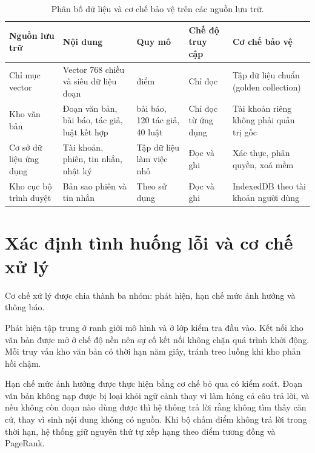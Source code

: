 \begin{table}[htbp]
    \centering
    \caption{Phân bố dữ liệu và cơ chế bảo vệ trên các nguồn lưu trữ.}
    \label{tab:nguon-luu-tru}
    \small
    \begin{tabularx}{\textwidth}{@{}>{\raggedright\arraybackslash}p{2.6cm}>{\raggedright\arraybackslash}p{3.4cm}>{\raggedright\arraybackslash}p{2.4cm}>{\raggedright\arraybackslash}p{2.2cm}>{\raggedright\arraybackslash}X@{}}
        \toprule
        \textbf{Nguồn lưu trữ} & \textbf{Nội dung} & \textbf{Quy mô} & \textbf{Chế độ truy cập} & \textbf{Cơ chế bảo vệ} \\
        \midrule
        Chỉ mục vector & Vector 768 chiều và siêu dữ liệu đoạn & 913.205 điểm & Chỉ đọc & Tập dữ liệu chuẩn (golden collection) \\
        Kho văn bản & Đoạn văn bản, bài báo, tác giả, luật kết hợp & 70.590 bài báo, 120 tác giả, 40 luật & Chỉ đọc từ ứng dụng & Tài khoản riêng không phải quản trị gốc \\
        Cơ sở dữ liệu ứng dụng & Tài khoản, phiên, tin nhắn, nhật ký & Tập dữ liệu làm việc nhỏ & Đọc và ghi & Xác thực, phân quyền, xoá mềm \\
        Kho cục bộ trình duyệt & Bản sao phiên và tin nhắn & Theo sử dụng & Đọc và ghi & IndexedDB theo tài khoản người dùng \\
        \bottomrule
    \end{tabularx}
\end{table}

\section{Xác định tình huống lỗi và cơ chế xử lý}
\label{sec:tinh-huong-loi}

Cơ chế xử lý được chia thành ba nhóm: phát hiện, hạn chế mức ảnh hưởng và thông báo.

Phát hiện tập trung ở ranh giới mô hình và ở lớp kiểm tra đầu vào. Kết nối kho văn bản được mở ở chế độ nền nên sự cố kết nối không chặn quá trình khởi động. Mỗi truy vấn kho văn bản có thời hạn năm giây, tránh treo luồng khi kho phản hồi chậm.

Hạn chế mức ảnh hưởng được thực hiện bằng cơ chế bỏ qua có kiểm soát. Đoạn văn bản không nạp được bị loại khỏi ngữ cảnh thay vì làm hỏng cả câu trả lời, và nếu không còn đoạn nào dùng được thì hệ thống trả lời rằng không tìm thấy căn cứ, thay vì sinh nội dung không có nguồn. Khi bộ chấm điểm không trả lời trong thời hạn, hệ thống giữ nguyên thứ tự xếp hạng theo điểm tương đồng và PageRank.

